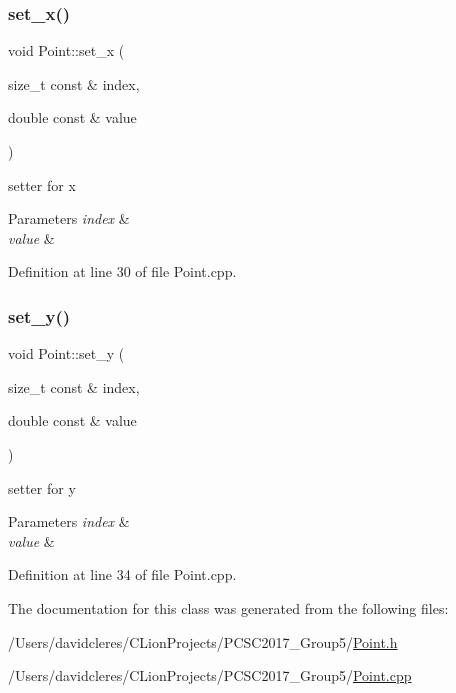 \subsubsection{\texorpdfstring{set\+\_\+x()}{set\_x()}}
{\footnotesize\ttfamily void Point\+::set\+\_\+x (\begin{DoxyParamCaption}\item[{size\+\_\+t const \&}]{index,  }\item[{double const \&}]{value }\end{DoxyParamCaption})}



setter for x 


\begin{DoxyParams}{Parameters}
{\em index} & \\
\hline
{\em value} & \\
\hline
\end{DoxyParams}


Definition at line 30 of file Point.\+cpp.

\mbox{\label{class_point_a40f61acc21fc1416c2cc1034ee2a928a}} 
\subsubsection{\texorpdfstring{set\+\_\+y()}{set\_y()}}
{\footnotesize\ttfamily void Point\+::set\+\_\+y (\begin{DoxyParamCaption}\item[{size\+\_\+t const \&}]{index,  }\item[{double const \&}]{value }\end{DoxyParamCaption})}



setter for y 


\begin{DoxyParams}{Parameters}
{\em index} & \\
\hline
{\em value} & \\
\hline
\end{DoxyParams}


Definition at line 34 of file Point.\+cpp.



The documentation for this class was generated from the following files\+:\begin{DoxyCompactItemize}
\item 
/\+Users/davidcleres/\+C\+Lion\+Projects/\+P\+C\+S\+C2017\+\_\+\+Group5/\mbox{\hyperlink{_point_8h}{Point.\+h}}\item 
/\+Users/davidcleres/\+C\+Lion\+Projects/\+P\+C\+S\+C2017\+\_\+\+Group5/\mbox{\hyperlink{_point_8cpp}{Point.\+cpp}}\end{DoxyCompactItemize}
